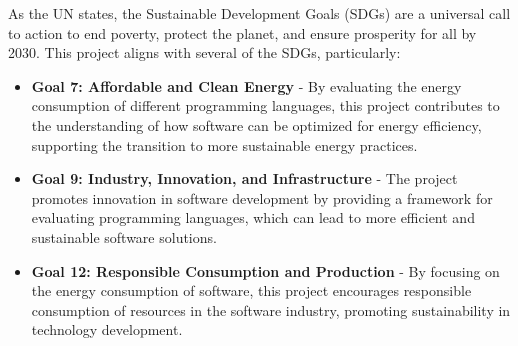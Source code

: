 As the UN states, the Sustainable Development Goals (SDGs) \cite{sdg-un} are a universal call to action to end poverty, protect the planet, and ensure prosperity for all by 2030. This project aligns with several of the SDGs, particularly:
\begin{itemize}
    \item \textbf{Goal 7: Affordable and Clean Energy} - By evaluating the energy consumption of different programming languages, this project contributes to the understanding of how software can be optimized for energy efficiency, supporting the transition to more sustainable energy practices.
    \item \textbf{Goal 9: Industry, Innovation, and Infrastructure} - The project promotes innovation in software development by providing a framework for evaluating programming languages, which can lead to more efficient and sustainable software solutions.
    \item \textbf{Goal 12: Responsible Consumption and Production} - By focusing on the energy consumption of software, this project encourages responsible consumption of resources in the software industry, promoting sustainability in technology development.
\end{itemize}